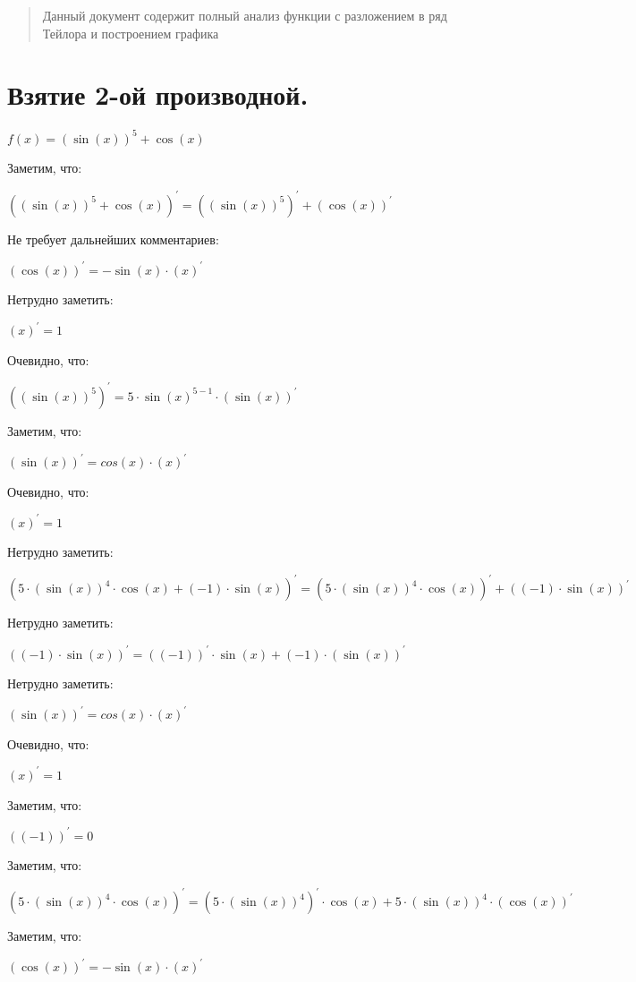 \documentclass{article}
\begin{document}
\renewcommand{\abstractname}{Полный анализ функции}\begin{abstract}Данный документ содержит полный анализ функции с разложением в ряд Тейлора и построением графика\end{abstract}
\section{Взятие 2-ой производной.}

$ f(x) = {(\sin(x))}^{5} + \cos(x)$

Заметим, что:

${({(\sin(x))}^{5} + \cos(x))}^{'} = {({(\sin(x))}^{5})}^{'} + {(\cos(x))}^{'}$

Не требует дальнейших комментариев:

${(\cos(x))}^{'} = - \sin (x) \cdot{(x)}^{'}$

Нетрудно заметить:

${(x)}^{'} = 1$

Очевидно, что:

${({(\sin(x))}^{5})}^{'} = 5\cdot {\sin(x)}^{5 - 1} \cdot{(\sin(x))}^{'}$

Заметим, что:

${(\sin(x))}^{'} = cos(x) \cdot{(x)}^{'}$

Очевидно, что:

${(x)}^{'} = 1$

Нетрудно заметить:

${(5 \cdot {(\sin(x))}^{4} \cdot \cos(x) + (-1) \cdot \sin(x))}^{'} = {(5 \cdot {(\sin(x))}^{4} \cdot \cos(x))}^{'} + {((-1) \cdot \sin(x))}^{'}$

Нетрудно заметить:

${((-1) \cdot \sin(x))}^{'} = {((-1))}^{'}\cdot \sin(x) + (-1)\cdot {(\sin(x))}^{'}$

Нетрудно заметить:

${(\sin(x))}^{'} = cos(x) \cdot{(x)}^{'}$

Очевидно, что:

${(x)}^{'} = 1$

Заметим, что:

${((-1))}^{'} = 0$

Заметим, что:

${(5 \cdot {(\sin(x))}^{4} \cdot \cos(x))}^{'} = {(5 \cdot {(\sin(x))}^{4})}^{'}\cdot \cos(x) + 5 \cdot {(\sin(x))}^{4}\cdot {(\cos(x))}^{'}$

Заметим, что:

${(\cos(x))}^{'} = - \sin (x) \cdot{(x)}^{'}$
\end{document}
